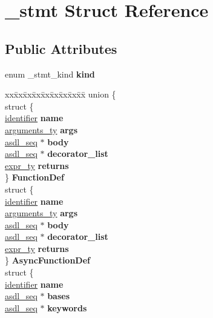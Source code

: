 \hypertarget{struct__stmt}{}\section{\+\_\+stmt Struct Reference}
\label{struct__stmt}
\subsection*{Public Attributes}
\begin{DoxyCompactItemize}
\item 
enum \+\_\+stmt\+\_\+kind {\bfseries kind}\hypertarget{struct__stmt_a9074cf45fef325a5baa737d59102ec9a}{}\label{struct__stmt_a9074cf45fef325a5baa737d59102ec9a}

\item 
\begin{tabbing}
xx\=xx\=xx\=xx\=xx\=xx\=xx\=xx\=xx\=\kill
union \{\\
\>struct \{\\
\>\>\hyperlink{struct__object}{identifier} {\bfseries name}\\
\>\>\hyperlink{struct__arguments}{arguments\_ty} {\bfseries args}\\
\>\>\hyperlink{structasdl__seq}{asdl\_seq} $\ast$ {\bfseries body}\\
\>\>\hyperlink{structasdl__seq}{asdl\_seq} $\ast$ {\bfseries decorator\_list}\\
\>\>\hyperlink{struct__expr}{expr\_ty} {\bfseries returns}\\
\>\} {\bfseries FunctionDef}\\
\>struct \{\\
\>\>\hyperlink{struct__object}{identifier} {\bfseries name}\\
\>\>\hyperlink{struct__arguments}{arguments\_ty} {\bfseries args}\\
\>\>\hyperlink{structasdl__seq}{asdl\_seq} $\ast$ {\bfseries body}\\
\>\>\hyperlink{structasdl__seq}{asdl\_seq} $\ast$ {\bfseries decorator\_list}\\
\>\>\hyperlink{struct__expr}{expr\_ty} {\bfseries returns}\\
\>\} {\bfseries AsyncFunctionDef}\\
\>struct \{\\
\>\>\hyperlink{struct__object}{identifier} {\bfseries name}\\
\>\>\hyperlink{structasdl__seq}{asdl\_seq} $\ast$ {\bfseries bases}\\
\>\>\hyperlink{structasdl__seq}{asdl\_seq} $\ast$ {\bfseries keywords}\\

\end{tabbing}
\end{DoxyCompactItemize}

